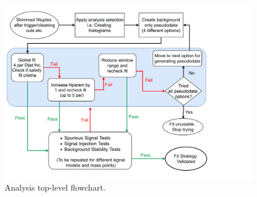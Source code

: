  
\begin{figure}[htb]
\centering
\includegraphics[width=1.1\textwidth]{fig/flowcharts/QGDijet-FlowChart-30March}
\caption{Analysis top-level flowchart.
\label{eflow}}
\end{figure}
%
%
%
